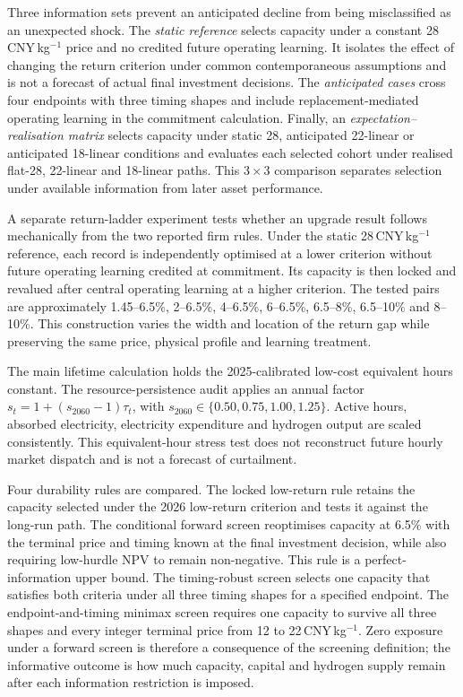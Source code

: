 \documentclass[pdflatex,sn-nature]{sn-jnl}
\begin{document}
Three information sets prevent an anticipated decline from being misclassified as an unexpected shock. The \emph{static reference} selects capacity under a constant 28\,CNY\,kg$^{-1}$ price and no credited future operating learning. It isolates the effect of changing the return criterion under common contemporaneous assumptions and is not a forecast of actual final investment decisions. The \emph{anticipated cases} cross four endpoints with three timing shapes and include replacement-mediated operating learning in the commitment calculation. Finally, an \emph{expectation--realisation matrix} selects capacity under static 28, anticipated 22-linear or anticipated 18-linear conditions and evaluates each selected cohort under realised flat-28, 22-linear and 18-linear paths. This $3\times3$ comparison separates selection under available information from later asset performance.

A separate return-ladder experiment tests whether an upgrade result follows mechanically from the two reported firm rules. Under the static 28\,CNY\,kg$^{-1}$ reference, each record is independently optimised at a lower criterion without future operating learning credited at commitment. Its capacity is then locked and revalued after central operating learning at a higher criterion. The tested pairs are approximately 1.45--6.5\%, 2--6.5\%, 4--6.5\%, 6--6.5\%, 6.5--8\%, 6.5--10\% and 8--10\%. This construction varies the width and location of the return gap while preserving the same price, physical profile and learning treatment.

The main lifetime calculation holds the 2025-calibrated low-cost equivalent hours constant. The resource-persistence audit applies an annual factor $s_t=1+(s_{2060}-1)\tau_t$, with $s_{2060}\in\{0.50,0.75,1.00,1.25\}$. Active hours, absorbed electricity, electricity expenditure and hydrogen output are scaled consistently. This equivalent-hour stress test does not reconstruct future hourly market dispatch and is not a forecast of curtailment.

Four durability rules are compared. The locked low-return rule retains the capacity selected under the 2026 low-return criterion and tests it against the long-run path. The conditional forward screen reoptimises capacity at 6.5\% with the terminal price and timing known at the final investment decision, while also requiring low-hurdle NPV to remain non-negative. This rule is a perfect-information upper bound. The timing-robust screen selects one capacity that satisfies both criteria under all three timing shapes for a specified endpoint. The endpoint-and-timing minimax screen requires one capacity to survive all three shapes and every integer terminal price from 12 to 22\,CNY\,kg$^{-1}$. Zero exposure under a forward screen is therefore a consequence of the screening definition; the informative outcome is how much capacity, capital and hydrogen supply remain after each information restriction is imposed.
\end{document}
